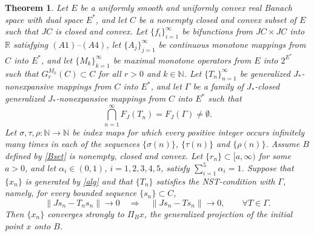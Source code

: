 \documentclass[10pt,a4paper]{amsart}
\newtheorem{theorem}{Theorem}[section]
\numberwithin{equation}{section}
\begin{document}
\begin{theorem}\label{mainthm}
Let $E$ be a uniformly smooth and uniformly convex real Banach space with dual space $E^{*}$, and let $C$ be a nonempty closed and convex subset of $E$ such that $JC$ is closed and convex. Let $\{f_i\}_{i=1}^{\infty}$ be bifunctions from $JC\times JC$ into $\mathbb{R}$ satisfying $(A1)$--$(A4)$, let $\{A_j\}_{j=1}^{\infty}$ be continuous monotone mappings from $C$ into $E^{*}$, and let $\{M_k\}_{k=1}^{\infty}$ be maximal monotone operators from $E$ into $2^{E^{*}}$ such that $G_r^{M_k}(C)\subset C$ for all $r>0$ and $k\in\mathbb{N}$. Let $\{T_n\}_{n=1}^{\infty}$ be generalized $J_{*}$-nonexpansive mappings from $C$ into $E^{*}$, and let $\Gamma$ be a family of $J_{*}$-closed generalized $J_{*}$-nonexpansive mappings from $C$ into $E^{*}$ such that
\[
\bigcap_{n=1}^{\infty}F_J(T_n)=F_J(\Gamma)\neq\emptyset.
\]
Let $\sigma,\tau,\rho:\mathbb N\to\mathbb N$ be index maps for which every positive integer occurs infinitely many times in each of the sequences $\{\sigma(n)\}$, $\{\tau(n)\}$ and $\{\rho(n)\}$. Assume $B$ defined by \eqref{Bset} is nonempty, closed and convex. Let $\{r_n\}\subset [a,\infty)$ for some $a>0$, and let $\alpha_i\in(0,1)$, $i=1,2,3,4,5$, satisfy $\sum_{i=1}^{5}\alpha_i=1$. Suppose that $\{x_n\}$ is generated by \eqref{alg} and that $\{T_n\}$ satisfies the NST-condition with $\Gamma$, namely, for every bounded sequence $\{s_n\}\subset C$,
\[
\|Js_n-T_ns_n\|\to0\quad \Longrightarrow\quad \|Js_n-Ts_n\|\to0,
\qquad \forall T\in\Gamma.
\]
Then $\{x_n\}$ converges strongly to $\Pi_Bx$, the generalized projection of the initial point $x$ onto $B$.
\end{theorem}
\end{document}
